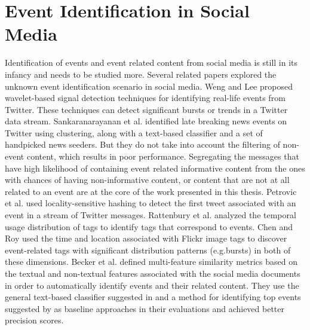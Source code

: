 \section{Event Identification in Social Media}
Identification of events and event related content from social media is still in its infancy and needs to be studied more. Several related papers explored the unknown event identification scenario in social media.
Weng and Lee \cite{weng2011event} proposed wavelet-based signal detection techniques for identifying
real-life events from Twitter. These techniques can detect significant bursts or trends
in a Twitter data stream. Sankaranarayanan et al. \cite{sankaranarayanan2009twitterstand}
identified late breaking news events on Twitter using clustering, along with a text-based
classifier and a set of handpicked news seeders. But they do not take into account the filtering of non-event content, which results in poor performance. Segregating the messages that have high likelihood of containing event related informative content from the ones with chances of having non-informative content, or content that are not at all related to an event are at the core of the work presented in this thesis.  Petrovic et al. \cite{petrovic2010streaming} used locality-sensitive hashing to detect the first tweet associated with an event in a stream of Twitter messages. Rattenbury et al. \cite{rattenbury2007towards} analyzed the temporal usage distribution of tags to identify tags that correspond to events. Chen and Roy \cite{chen2009event} used the time and location associated with Flickr image
tags to discover event-related tags with significant distribution patterns (e.g.bursts) in both of these dimensions. Becker et al. \cite{becker2010learning} defined multi-feature similarity metrics based on the textual and non-textual features associated with the social media documents in order to automatically identify events and their related content.
They use the general text-based classifier suggested in \cite{sankaranarayanan2009twitterstand} and a method for identifying top events suggested by \cite{petrovic2010streaming} as baseline approaches in their evaluations and achieved better precision scores.








